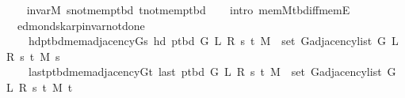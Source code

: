 \begin{isabellebody}
%
\isadelimproof
\ \ %
\endisadelimproof
%
\isatagproof
{}\isamarkupfalse%
\ invar{\isacharunderscore}{\kern0pt}M\ s{\isacharunderscore}{\kern0pt}not{\isacharunderscore}{\kern0pt}mem{\isacharunderscore}{\kern0pt}p{\isacharunderscore}{\kern0pt}tbd\ t{\isacharunderscore}{\kern0pt}not{\isacharunderscore}{\kern0pt}mem{\isacharunderscore}{\kern0pt}p{\isacharunderscore}{\kern0pt}tbd\isanewline
\ \ \isamarkupfalse%
\ {\isacharparenleft}{\kern0pt}intro\ mem{\isacharunderscore}{\kern0pt}M{\isacharunderscore}{\kern0pt}tbd{\isacharunderscore}{\kern0pt}iff{\isacharunderscore}{\kern0pt}mem{\isacharunderscore}{\kern0pt}E{}{\isacharparenright}{\kern0pt}%
\endisatagproof
{\isafoldproof}%
%
\isadelimproof
\isanewline
%
\endisadelimproof
%
\isadeliminvisible
\isanewline
%
\endisadeliminvisible
%
\isataginvisible
{}\isamarkupfalse%
\ {\isacharparenleft}{\kern0pt}\ edmonds{\isacharunderscore}{\kern0pt}karp{\isacharunderscore}{\kern0pt}invar{\isacharunderscore}{\kern0pt}not{\isacharunderscore}{\kern0pt}done{\isacharunderscore}{\kern0pt}{}{\isacharparenright}{\kern0pt}\isanewline
\ \ \isanewline
\ \ \ \ hd{\isacharunderscore}{\kern0pt}p{\isacharunderscore}{\kern0pt}tbd{\isacharunderscore}{\kern0pt}mem{\isacharunderscore}{\kern0pt}adjacency{\isacharunderscore}{\kern0pt}G{}{\isacharunderscore}{\kern0pt}s{\isacharcolon}{\kern0pt}\ {\isachardoublequoteopen}hd\ {\isacharparenleft}{\kern0pt}p{\isacharunderscore}{\kern0pt}tbd\ G\ L\ R\ s\ t\ M{\isacharparenright}{\kern0pt}\ {\isasymin}\ set\ {\isacharparenleft}{\kern0pt}G{\isachardot}{\kern0pt}adjacency{\isacharunderscore}{\kern0pt}list\ {\isacharparenleft}{\kern0pt}G{}\ L\ R\ s\ t\ M{\isacharparenright}{\kern0pt}\ s{\isacharparenright}{\kern0pt}{\isachardoublequoteclose}\ \isanewline
\ \ \ \ last{\isacharunderscore}{\kern0pt}p{\isacharunderscore}{\kern0pt}tbd{\isacharunderscore}{\kern0pt}mem{\isacharunderscore}{\kern0pt}adjacency{\isacharunderscore}{\kern0pt}G{}{\isacharunderscore}{\kern0pt}t{\isacharcolon}{\kern0pt}\ {\isachardoublequoteopen}last\ {\isacharparenleft}{\kern0pt}p{\isacharunderscore}{\kern0pt}tbd\ G\ L\ R\ s\ t\ M{\isacharparenright}{\kern0pt}\ {\isasymin}\ set\ {\isacharparenleft}{\kern0pt}G{\isachardot}{\kern0pt}adjacency{\isacharunderscore}{\kern0pt}list\ {\isacharparenleft}{\kern0pt}G{}\ L\ R\ s\ t\ M{\isacharparenright}{\kern0pt}\ t{\isacharparenright}{\kern0pt}{\isachardoublequoteclose}%
\endisataginvisible
{\isafoldinvisible}%
%
\isadeliminvisible

\end{isabellebody}

